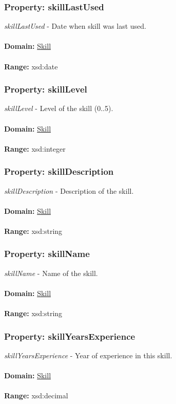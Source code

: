 \documentclass[a4paper,12pt]{article}
\numberwithin{equation}{section}
\begin{document}
\subsubsection{Property: skillLastUsed}\hypertarget{skillLastUsed}{}
\textit{skillLastUsed} - Date when skill was last used.
\\\\
\textbf{Domain:} \hyperlink{Skill}{Skill} 
\\\\
\textbf{Range:}  xsd:date

\subsubsection{Property: skillLevel}\hypertarget{skillLevel}{}
\textit{skillLevel} - Level of the skill (0..5).
\\\\
\textbf{Domain:} \hyperlink{Skill}{Skill} 
\\\\
\textbf{Range:}  xsd:integer

\subsubsection{Property: skillDescription}\hypertarget{skillDescription}{}
\textit{skillDescription} - Description of the skill.
\\\\
\textbf{Domain:} \hyperlink{Skill}{Skill} 
\\\\
\textbf{Range:}  xsd:string

\subsubsection{Property: skillName}\hypertarget{skillName}{}
\textit{skillName} - Name of the skill.
\\\\
\textbf{Domain:} \hyperlink{Skill}{Skill} 
\\\\
\textbf{Range:}  xsd:string

\subsubsection{Property: skillYearsExperience}\hypertarget{skillYearsExperience}{}
\textit{skillYearsExperience} - Year of experience in this skill.
\\\\
\textbf{Domain:} \hyperlink{Skill}{Skill} 
\\\\
\textbf{Range:}  xsd:decimal
\end{document}

